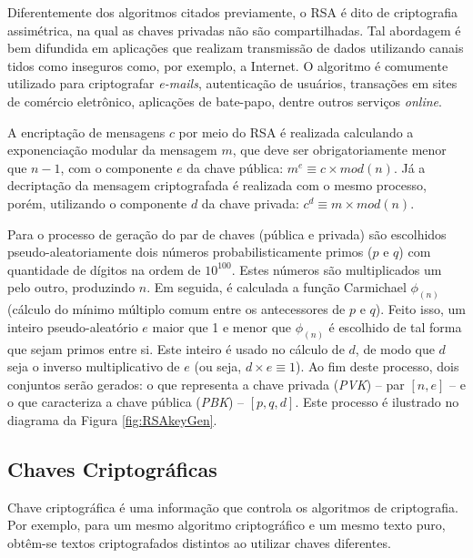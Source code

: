 \documentclass[a4paper,10pt,oneside,conference,final,keeplastbox]{inatel}
\newcommand{\internet}{Internet\xspace}
\begin{document}
                Diferentemente dos algoritmos citados previamente, o RSA é dito de criptografia assimétrica, na qual as chaves privadas não são compartilhadas. Tal abordagem é bem difundida em aplicações que realizam transmissão de dados utilizando canais tidos como inseguros como, por exemplo, a \internet. O algoritmo é comumente utilizado para criptografar \textit{e-mails}, autenticação de usuários, transações em sites de comércio eletrônico, aplicações de bate-papo, dentre outros serviços \textit{online}.
                
                A encriptação de mensagens $c$ por meio do RSA é realizada calculando a exponenciação modular da mensagem $m$, que deve ser obrigatoriamente menor que $n-1$, com o componente $e$ da chave pública: $m^e \equiv c \times mod (n)$. Já a decriptação da mensagem criptografada é realizada com o mesmo processo, porém, utilizando o componente $d$ da chave privada: $c^d \equiv m \times mod (n)$.
                
                Para o processo de geração do par de chaves (pública e privada) são escolhidos pseudo-aleatoriamente dois números probabilisticamente primos ($p$ e $q$) com quantidade de dígitos na ordem de $10^{100}$. Estes números são multiplicados um pelo outro, produzindo $n$. Em seguida, é calculada a função Carmichael $\phi_{(n)}$ (cálculo do mínimo múltiplo comum entre os antecessores de $p$ e $q$). Feito isso, um inteiro pseudo-aleatório $e$ maior que 1 e menor que $\phi_{(n)}$ é escolhido de tal forma que sejam primos entre si. Este inteiro é usado no cálculo de $d$, de modo que $d$ seja o inverso multiplicativo de $e$ (ou seja, $d \times e \equiv 1$). Ao fim deste processo, dois conjuntos serão gerados: o que representa a chave privada (\textit{PVK}) -- par $[n, e]$ -- e o que caracteriza a chave pública (\textit{PBK}) -- $[p, q, d]$. Este processo é ilustrado no diagrama da Figura \ref{fig:RSAkeyGen}.
                
                
        
        \subsection{Chaves Criptográficas}
        \label{subsec:chaves_criptograficas}
            
            Chave criptográfica é uma informação que controla os algoritmos de criptografia. Por exemplo, para um mesmo algoritmo criptográfico e um mesmo texto puro, obtêm-se textos criptografados distintos ao utilizar chaves diferentes.
            
\end{document}
